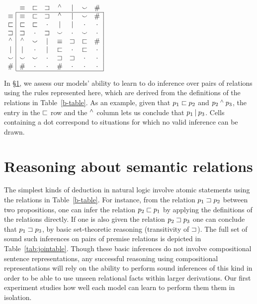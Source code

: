
\begin{table}[tp]
  \centering  \small
  \setlength{\arraycolsep}{8pt}
  \renewcommand{\arraystretch}{1.1}
  \newcommand{\UNK}{\cdot}  
  $\begin{array}[t]{c@{ \ }|*{7}{c}|}
    \multicolumn{1}{c}{}
             & \nateq     & \natfor     & \natrev     & \natneg    & \natalt     & \natcov     & \multicolumn{1}{c}{\natind} \\
    \cline{2-8}
    \nateq  & \nateq &   \natfor &  \natrev &  \natneg &   \natalt &  \natcov &  \natind \\
    \natfor & \natfor &  \natfor &  \UNK &  \natalt &   \natalt &  \UNK &  \UNK \\
    \natrev & \natrev &  \UNK &  \natrev &  \natcov &   \UNK &  \natcov &  \UNK \\
    \natneg & \natneg &  \natcov &  \natalt &  \nateq &    \natrev &  \natfor &  \natind \\
    \natalt & \natalt &  \UNK &  \natalt &  \natfor &   \UNK &  \natfor &  \UNK \\
    \natcov & \natcov &  \natcov &  \UNK &  \natrev &   \natrev &  \UNK &  \UNK \\
    \natind & \natind & \UNK &  \UNK &  \natind &  \UNK &  \UNK &  \UNK \\
    \cline{2-8}
  \end{array}$
  \caption{In \S\ref{sec:join}, we assess our models' ability to learn to do inference over pairs of relations using the rules represented here, which are derived from the definitions of the relations in Table~\ref{b-table}.  As an example, given that $p_1 \sqsubset p_2$ and $p_2 \mathbin{^{\wedge}} p_3$, the entry in the $\sqsubset$ row and the $\mathbin{^{\wedge}}$ column lets us conclude that $p_1 \mathbin{|} p_3$. Cells containing a dot correspond to situations for which no valid inference can be drawn.} 
  \label{tab:jointable}
\end{table}

\section{Reasoning about semantic relations}\label{sec:join}

The simplest kinds of deduction in natural logic involve atomic statements 
using the relations in Table~\ref{b-table}. 
For instance, from the relation $p_1 \sqsupset p_2$ between two propositions, 
one can infer the relation $p_2 \sqsubset p_1$ by applying the definitions of the relations directly. 
If one is also given the relation $p_2 \sqsupset p_3$ one can conclude that $p_1 \sqsupset p_3$, by basic set-theoretic reasoning (transitivity of $\sqsupset$). The
full set of sound such inferences on pairs of premise relations is depicted in
Table~\ref{tab:jointable}. Though these basic inferences do not involve compositional
sentence representations, any successful reasoning using compositional representations
will rely on the ability to perform sound inferences of this kind in order to be able to use unseen relational facts within larger derivations. Our first experiment studies how well each model can learn to perform them them in isolation.

